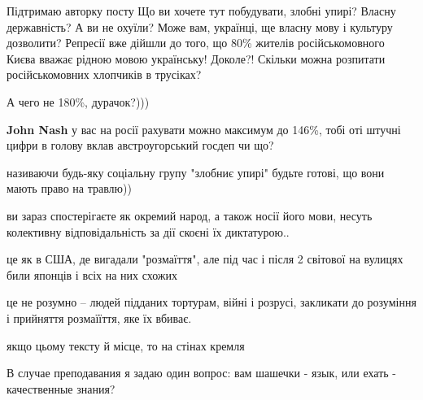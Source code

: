 \begin{itemize}
Підтримаю авторку посту Що ви хочете тут побудувати, злобні упирі? Власну
державність? А ви не охуїли? Може вам, українці, ще власну мову і культуру
дозволити? Репресії вже дійшли до того, що 80\% жителів російськомовного Києва
вважає рідною мовою українську! Доколе?! Скільки можна розпитати
російськомовних хлопчиків в трусіках?

\begin{itemize}
 
А чего не 180\%, дурачок?)))

 
\textbf{John Nash} у вас на росії рахувати можно максимум до 146\%, тобі оті штучні цифри в голову вклав австроугорський госдеп чи що?
\end{itemize}

 

називаючи будь-яку соціальну групу "злобниє упирі" будьте готові, що вони мають
право на травлю))

ви зараз спостерігаєте як окремий народ, а також носії його мови, несуть
колективну відповідальність за дії скоєні їх диктатурою..

це як в США, де вигадали "розмаїття", але під час і після 2 світової на вулицях
били японців і всіх на них схожих

це не розумно – людей підданих тортурам, війні і розрусі, закликати до
розуміння і прийняття розмаїїття, яке їх вбиває.

якщо цьому тексту й місце, то на стінах кремля

 

В случае преподавания я задаю один вопрос: вам шашечки - язык, или ехать -
качественные знания?


\end{itemize}
